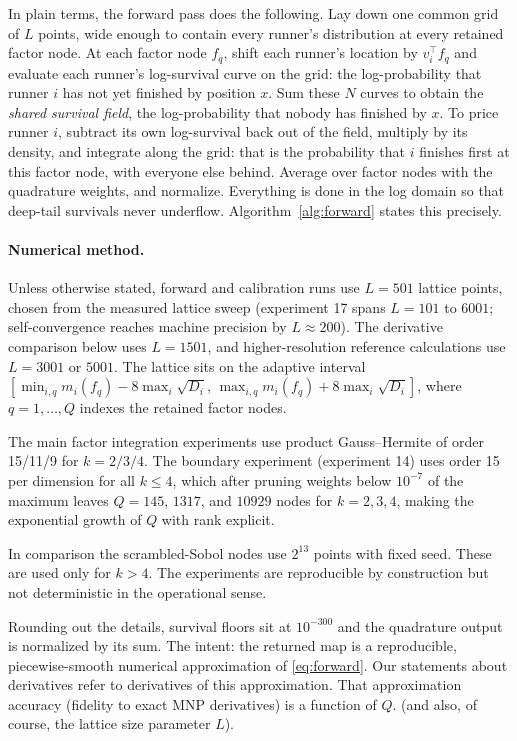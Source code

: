 \documentclass[12pt]{article}
\theoremstyle{remark}
\begin{document}
In plain terms, the forward pass does the following. Lay down one common
grid of $L$ points, wide enough to contain every runner's distribution
at every retained factor node. At each factor node $f_q$, shift each
runner's location by $v_i^\top f_q$ and evaluate each runner's
log-survival curve on the grid: the log-probability that runner $i$ has
not yet finished by position $x$. Sum these $N$ curves to obtain the
\emph{shared survival field}, the log-probability that nobody has
finished by $x$. To price runner $i$, subtract its own log-survival
back out of the field, multiply by its density, and integrate along the
grid: that is the probability that $i$ finishes first at this factor
node, with everyone else behind. Average over factor nodes with the
quadrature weights, and normalize. Everything is done in the log domain
so that deep-tail survivals never underflow. Algorithm~\ref{alg:forward}
states this precisely.

\paragraph{Numerical method.} Unless otherwise stated, forward and
calibration runs use $L = 501$ lattice points, chosen from the measured
lattice sweep (experiment 17 spans $L = 101$ to $6001$;
self-convergence reaches machine precision by $L \approx 200$). The
derivative comparison below uses $L = 1501$, and higher-resolution
reference calculations use $L = 3001$ or $5001$. The lattice sits on
the adaptive interval
$[\min_{i,q} m_i(f_q) - 8\max_i\sqrt{D_i},\,
\max_{i,q} m_i(f_q) + 8\max_i\sqrt{D_i}]$, where $q = 1, \dots, Q$ indexes
the retained factor nodes.

The main factor integration experiments use product
Gauss--Hermite of order 15/11/9 for $k = 2/3/4$. The boundary experiment
(experiment 14) uses order 15 per dimension for all $k \le 4$, which after
pruning weights below $10^{-7}$ of the maximum leaves $Q = 145$, $1317$, and
$10929$ nodes for $k = 2, 3, 4$, making the exponential growth of $Q$
with rank explicit. 

In comparison the scrambled-Sobol nodes use $2^{13}$ points with fixed seed. These
are used only for $k > 4$. The experiments are reproducible by construction but not deterministic in 
the operational sense. 

Rounding out the details, survival floors sit at $10^{-300}$ and the quadrature output is normalized by
its sum. The intent: the returned map is a reproducible, piecewise-smooth numerical
approximation of \eqref{eq:forward}. Our statements about derivatives refer to
derivatives of this approximation. That approximation accuracy (fidelity to exact MNP derivatives) is
a function of $Q$. (and also, of course, the lattice size parameter $L$).  
\end{document}
